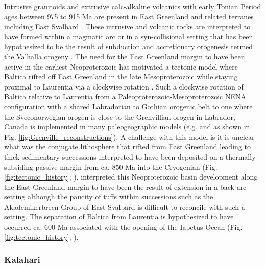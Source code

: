 \documentclass[twocolumn, switch]{article} %
\begin{document}
Intrusive granitoids and extrusive calc-alkaline volcanics with early Tonian Period ages between 975 to 915 Ma are present in East Greenland and related terranes including East Svalbard \citep{McClelland2019a}. These intrusive and volcanic rocks are interpreted to have formed within a magmatic arc or in a syn-collisional setting \citep{Johansson1999a} that has been hypothesized to be the result of subduction and accretionary orogenesis termed the Valhalla orogeny \citep{Cawood2010a}. The need for the East Greenland margin to have been active in the earliest Neoproterozoic has motivated a tectonic model where Baltica rifted off East Greenland in the late Mesoproterozoic while staying proximal to Laurentia via a clockwise rotation \citep{Cawood2010a}. Such a clockwise rotation of Baltica relative to Laurentia from a Paleoproterozoic-Mesoproterozoic NENA configuration with a shared Labradorian to Gothian orogenic belt to one where the Sveconorwegian orogen is close to the Grenvillian orogen in Labrador, Canada is implemented in many paleogeographic models (e.g. \citealp{Evans2009a} and as shown in Fig. \ref{fig:Grenville_reconstructions}). A challenge with this model is it is unclear what was the conjugate lithosphere that rifted from East Greenland leading to thick sedimentary successions interpreted to have been deposited on a thermally-subsiding passive margin from ca. 850 Ma into the Cryogenian (Fig. \ref{fig:tectonic_history}; \citealp{Maloof2006a}). \cite{Malone2014a} interpreted this Neoproterozoic basin development along the East Greenland margin to have been the result of extension in a back-arc setting although the paucity of tuffs within successions such as the Akademikerbreen Group of East Svalbard is difficult to reconcile with such a setting. The separation of Baltica from Laurentia is hypothesized to have occurred ca. 600 Ma associated with the opening of the Iapetus Ocean (Fig. \ref{fig:tectonic_history}; \citep{Cawood2001a}).

\subsubsection{Kalahari}
\end{document}
